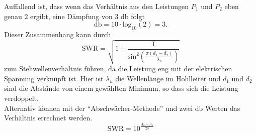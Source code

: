 Auffallend ist, dass wenn das Verhältnis aus den Leistungen $P_1$ und $P_2$ eben genau $2$ ergibt, eine Dämpfung von 3 $\si{\decibel}$ folgt
\begin{equation*}
    \si{\decibel} = 10 \cdot \text{log}_{10} (2) = 3.
\end{equation*}
Dieser Zusammenhang kann durch 
\begin{equation}
    \label{eqn:SWR}
    \text{SWR} =\sqrt{1 + \frac{1}{ \text{sin}^2 \left( \frac{\pi (d_1 - d_2)}{\lambda_h}  \right)} } 
\end{equation}
zum Stehwellenverhältnis führen, da die Leistung eng mit der elektrischen Spannung verknüpft ist. 
Hier ist $\lambda_h$ die Wellenlänge im Hohlleiter und $d_1$ und $d_2$ sind die Abstände von einem gewählten Minimum, so dass sich die Leistung verdoppelt. \\
Alternativ können mit der \enquote{Abschwächer-Methode} und zwei $\si{\decibel}$ Werten das Verhältnis errechnet werden.
\begin{equation}
    \label{eqn:SWR2}
    \text{SWR} = 10^{\frac{A_2-A_1}{20}}
\end{equation}




